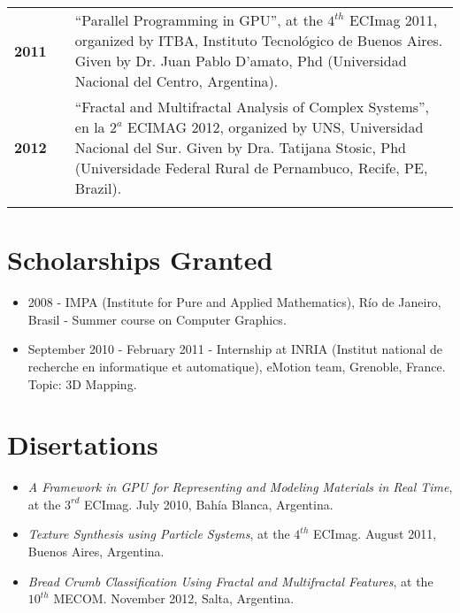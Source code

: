 \documentclass[a4paper,12pt]{article}
\begin{document}
\begin{tabular}{lcp{10 cm}}
\bf{2011}& & \textquotedblleft Parallel Programming in GPU\textquotedblright, at the $4^{th}$ ECImag 2011, organized by ITBA, Instituto Tecnol\'ogico de Buenos Aires. Given by Dr. Juan Pablo D'amato, Phd (Universidad Nacional del Centro, Argentina).\\
\bf{2012}& & \textquotedblleft Fractal and Multifractal Analysis of Complex Systems\textquotedblright, en la $2^{a}$ ECIMAG 2012, organized by UNS, Universidad Nacional del Sur. Given by Dra. Tatijana Stosic, Phd (Universidade Federal Rural de Pernambuco, Recife, PE, Brazil).\\
\\
\end{tabular}

\section*{Scholarships Granted}

\begin{itemize}
\item 2008 - IMPA (Institute for Pure and Applied Mathematics), R\'io de Janeiro, Brasil - Summer course on Computer Graphics.
\item September 2010 - February 2011 - Internship at INRIA (Institut national de recherche en informatique et automatique), eMotion team, Grenoble, France. Topic: 3D Mapping.
\end{itemize}

\section*{Disertations}
\begin{itemize}
\item {\it A Framework in GPU for Representing and Modeling Materials in Real Time}, at the $3^{rd}$ ECImag. July 2010, Bahía Blanca, Argentina.
\item {\it Texture Synthesis using Particle Systems}, at the $4^{th}$ ECImag. August 2011, Buenos Aires, Argentina.
\item {\it Bread Crumb Classification Using Fractal and Multifractal Features}, at the $10^{th}$ MECOM. November 2012, Salta, Argentina.
\end{itemize}
\end{document}
